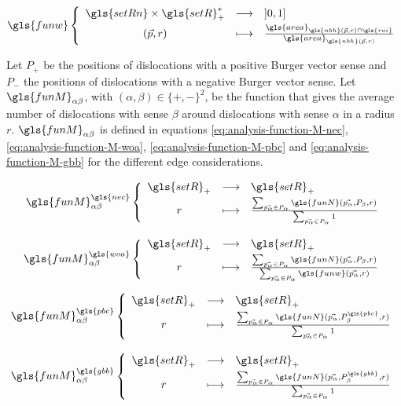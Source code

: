 \begin{equation}\label{eq:analysis-function-w}
  \define{
    \gls{funw}
  }{
    \gls{setRn} \times \gls{setR}_+^*
  }{
    ]0, 1]
  }{
    (\vec{p}, r)
  }{
    \frac{\gls{area}_{\gls{nbh}(\vec{p}, r) \cap \gls{roi}}}{\gls{area}_{\gls{nbh}(\vec{p}, r)}}
  }
\end{equation}

Let \( P_+ \) be the positions of dislocations with a positive Burger vector sense and \( P_- \) the positions of dislocations with a negative Burger vector sense.
Let \( \gls{funM}_{\alpha \beta} \), with \( (\alpha, \beta) \in \{ +, - \}^2 \), be the function that gives the average number of dislocations with sense \( \beta \) around dislocations with sense \( \alpha \) in a radius \( r \).
\( \gls{funM}_{\alpha \beta} \) is defined in equations \eqref{eq:analysis-function-M-nec}, \eqref{eq:analysis-function-M-woa}, \eqref{eq:analysis-function-M-pbc} and \eqref{eq:analysis-function-M-gbb} for the different edge considerations.

\begin{minipage}{0.5\linewidth}
  \begin{align}
    \define{
      \gls{funM}_{\alpha \beta}^{\gls{nec}} &
    }{
      \gls{setR}_+
    }{
      \gls{setR}_+
    }{
      r
    }{
      \frac{\sum_{\vec{p_\alpha} \in P_\alpha} \gls{funN}(\vec{p_\alpha}, P_\beta, r)}{\sum_{\vec{p_\alpha} \in P_\alpha} 1}
    }
    \label{eq:analysis-function-M-nec}
    \\[0.3cm]
    \define{
      \gls{funM}_{\alpha \beta}^{\gls{woa}} &
    }{
      \gls{setR}_+
    }{
      \gls{setR}_+
    }{
      r
    }{
      \frac{\sum_{\vec{p_\alpha} \in P_\alpha} \gls{funN}(\vec{p_\alpha}, P_\beta, r)}{\sum_{\vec{p_\alpha} \in P_\alpha} \gls{funw} \left(\vec{p_\alpha}, r \right)}
    }
    \label{eq:analysis-function-M-woa}
  \end{align}
\end{minipage}%
\begin{minipage}{0.5\linewidth}
  \begin{align}
    \define{
      \gls{funM}_{\alpha \beta}^{\gls{pbc}} &
    }{
      \gls{setR}_+
    }{
      \gls{setR}_+
    }{
      r
    }{
      \frac{\sum_{\vec{p_\alpha} \in P_\alpha} \gls{funN}(\vec{p_\alpha}, P_\beta^{\gls{pbc}}, r)}{\sum_{\vec{p_\alpha} \in P_\alpha} 1}
    }
    \label{eq:analysis-function-M-pbc}
    \\[0.3cm]
    \define{
      \gls{funM}_{\alpha \beta}^{\gls{gbb}} &
    }{
      \gls{setR}_+
    }{
      \gls{setR}_+
    }{
      r
    }{
      \frac{\sum_{\vec{p_\alpha} \in P_\alpha} \gls{funN}(\vec{p_\alpha}, P_\beta^{\gls{gbb}}, r)}{\sum_{\vec{p_\alpha} \in P_\alpha} 1}
    }
    \label{eq:analysis-function-M-gbb}
  \end{align}
\end{minipage}%

